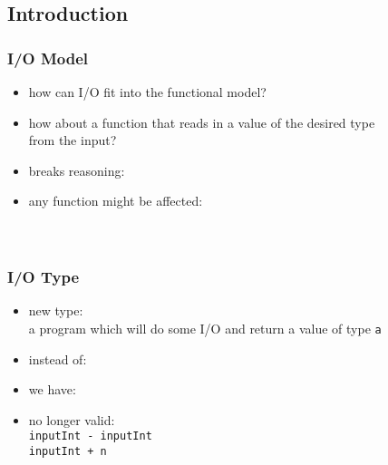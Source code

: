 \documentclass[dvipsnames]{beamer}
\theoremstyle{plain}
\begin{document}
\subsection{Introduction}

\begin{frame}
  \frametitle{I/O Model}

  \begin{itemize}
    \item how can I/O fit into the functional model?

    \bigskip
    \item how about a function that reads in a value of the desired type\\
      from the input?\\
      \smallskip

    \pause
    \medskip
    \item breaks reasoning:\\
      \smallskip

    \medskip
    \item any function might be affected:\\
      \smallskip
      \\
      \\
  \end{itemize}
\end{frame}

\begin{frame}
  \frametitle{I/O Type}

  \begin{itemize}
    \item new type: \\
      a program which will do some I/O and return a value of type \texttt{a}

    \medskip
    \item instead of:\\
      \smallskip
    \item we have:\\
      \smallskip

    \pause
    \medskip
    \item no longer valid:\\
      \texttt{inputInt - inputInt}\\
      \texttt{inputInt + n}
  \end{itemize}
\end{frame}
\end{document}
